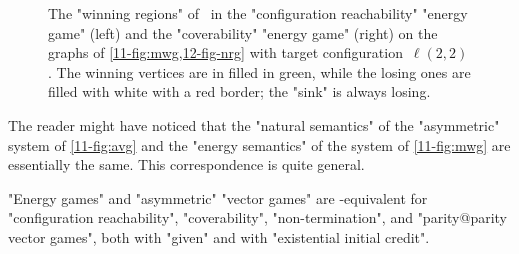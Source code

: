 \begin{figure}[htbp]
{}
  \caption{The "winning regions" of \Eve\ in the
    "configuration reachability" "energy game" (left) and the
    "coverability" "energy game"
    (right) on the graphs of \cref{11-fig:mwg,12-fig-nrg} with target
    configuration~$\ell(2,2)$.  The winning vertices are in filled in
    green, while the losing ones are filled with white with a red
    border; the "sink" is always losing.}\label{11-fig:cov-nrg}
\end{figure}

The reader might have noticed that the "natural semantics" of the
"asymmetric" system of \cref{11-fig:avg} and the "energy semantics" of
the system of \cref{11-fig:mwg} are essentially the same.  This
correspondence is quite general.
\begin{lemma}\label{11-fact-nrg}
  "Energy games" and "asymmetric" "vector games" are
  \logspace-equivalent for "configuration reachability",
  "coverability", "non-termination", and "parity@parity vector games",
  both with "given" and with "existential initial credit".
\end{lemma}
